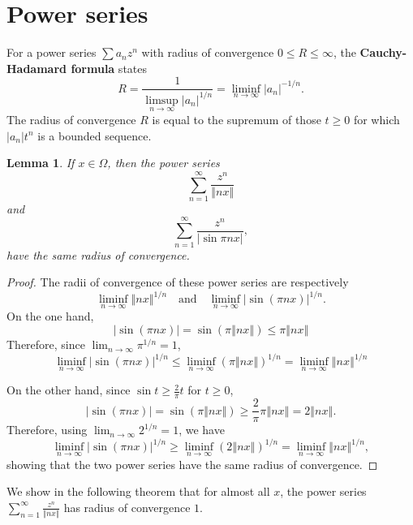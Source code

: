 \documentclass{amsart}
\newcommand{\norm}[1]{\left\Vert #1 \right\Vert}
\newtheorem{lemma}[theorem]{Lemma}
\begin{document}
\section{Power series}
\label{powersection}
For a power series $\sum a_n z^n$ with radius of convergence $0 \leq R \leq \infty$, the \textbf{Cauchy-Hadamard formula} \cite[p.~111,
Chapter 4, \S 1]{remmert}
states
\begin{equation}
R =\frac{1}{\limsup_{n \to \infty} |a_n|^{1/n}} =  \liminf_{n \to \infty} |a_n|^{-1/n}.
\label{cauchyhadamard}
\end{equation}
The radius of convergence $R$ is equal to the supremum of those $t \geq 0$ for which 
 $|a_n| t^n$ is a bounded sequence.
 

\begin{lemma}
If $x \in \Omega$, then
the power series
\[
\sum_{n=1}^\infty \frac{z^n}{\norm{nx}}
\]
and 
\[
\sum_{n=1}^\infty \frac{z^n}{|\sin \pi n x|},
\]
have the same radius of convergence.
\label{sameradius}
\end{lemma}
\begin{proof}
The radii of convergence of these power series are respectively
\[
\liminf_{n \to \infty} \norm{nx}^{1/n} \quad \textrm{and} \quad  \liminf_{n \to \infty} |\sin(\pi n x)|^{1/n}.
\]
On the one hand, 
\[
|\sin(\pi nx)|=\sin(\pi \norm{nx}) \leq \pi \norm{nx}
\]
Therefore, since $\lim_{n \to \infty} \pi^{1/n}=1$,
\[
\liminf_{n \to \infty} |\sin(\pi nx)|^{1/n} \leq \liminf_{n\to \infty} \left(\pi\norm{nx}\right)^{1/n}
=\liminf_{n \to \infty} \norm{nx}^{1/n}
\]

On the other hand, since $\sin t \geq \frac{2}{\pi}t$ for $t \geq 0$,
\[
|\sin(\pi n x)|=\sin(\pi\norm{nx}) \geq \frac{2}{\pi} \pi\norm{nx}=2\norm{nx}.
\]
Therefore, using $\lim_{n \to \infty} 2^{1/n}=1$, we have
\[
\liminf_{n \to \infty} |\sin(\pi n x)|^{1/n} \geq \liminf_{n \to \infty} \left(2\norm{nx}\right)^{1/n}
=\liminf_{n \to \infty} \norm{nx}^{1/n},
\]
showing that the two power series have the same radius of convergence.
\end{proof}

We  show in the following theorem that for almost all $x$, the power series $\sum_{n=1}^\infty \frac{z^n}{\norm{nx}}$ has radius of convergence $1$.
\end{document}
